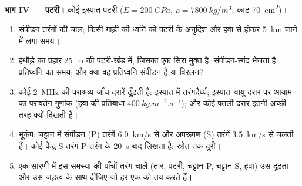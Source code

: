 \begin{problem}
\medskip
\noindent\textbf{भाग IV --- पटरी।}
कोई इस्पात-पटरी ($E = \qty{200}{GPa}$, $\rho = \qty{7800}{kg/m^3}$, काट
\qty{70}{cm^2})।
\begin{enumerate}[resume]
  \item संपीडन तरंगों की चाल; किसी गाड़ी की ध्वनि को पटरी के अनुदिश
        और हवा से होकर \qty{5}{km} जाने में लगा समय।
  \item हथौड़े का प्रहार \qty{25}{m} की पटरी-खंड में, जिसका एक सिरा
        मुक्त है, संपीडन-स्पंद भेजता है: प्रतिध्वनि का समय; और क्या वह
        प्रतिध्वनि संपीडन है या विरलन?
  \item कोई \qty{2}{MHz} की पराश्रव्य जाँच दरारें ढूँढ़ती है: इस्पात में
        तरंगदैर्घ्य; इस्पात--वायु दरार पर आयाम का परावर्तन गुणांक
        (हवा की प्रतिबाधा $\qty{400}{kg.m^{-2}.s^{-1}}$); और कोई पतली
        दरार इतनी अच्छी तरह क्यों दिखती है।
  \item भूकंप: चट्टान में संपीडन (P) तरंगें \qty{6.0}{km/s} से और
        अपरूपण (S) तरंगें \qty{3.5}{km/s} से चलती हैं। कोई केंद्र
        S तरंग P तरंग के \qty{20}{s} बाद लिखता है: स्रोत तक
        दूरी।
  \item एक सारणी में इस समस्या की पाँचों तरंग-चालें (तार, पटरी,
        चट्टान P, चट्टान S, हवा) उस दृढ़ता और उस जड़त्व के साथ दीजिए
        जो हर एक को तय करते हैं।
\end{enumerate}
\end{problem}
